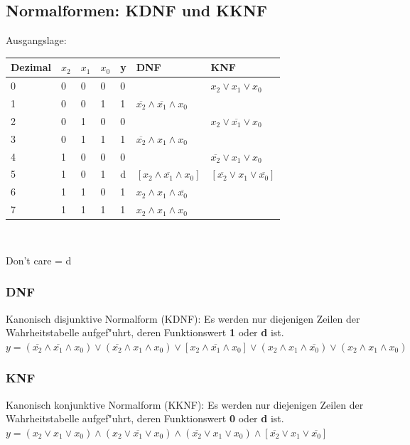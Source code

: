 \subsection{Normalformen: KDNF und KKNF}
	\begin{minipage}{10cm}
		Ausgangslage:\\
		\begin{tabular}{|l|l|l|l|l||l||l|}
			\hline	
				Dezimal & $x_2$ & $x_1$ & $x_0$ & y & DNF & KNF\\	
			\hline
			\hline
				0 & 0 & 0 & 0 & 0 & & $x_2 \vee x_1 \vee x_0$ \\
			\hline	
				1 & 0 & 0 & 1 & 1 &	$\overline{x_2} \wedge \overline{x_1} \wedge x_0$ & \\
			\hline
				2 & 0 & 1 & 0 & 0 & & $x_2 \vee \overline{x_1} \vee x_0$  \\
			\hline
				3 & 0 & 1 & 1 & 1 &	$\overline{x_2} \wedge x_1 \wedge x_0$ & \\
			\hline
				4 & 1 & 0 & 0 & 0 & & $\overline{x_2} \vee x_1 \vee x_0$ \\
			\hline
				5 & 1 & 0 & 1 & d & $[x_2 \wedge \overline{x_1} \wedge x_0]$ & $[\overline{x_2} \vee x_1 \vee \overline{x_0}]$  \\
			\hline
				6 & 1 & 1 & 0 & 1 & $x_2 \wedge x_1 \wedge \overline{x_0}$ &  \\
			\hline
				7 & 1 & 1 & 1 & 1 & $x_2 \wedge x_1 \wedge x_0$ &\\
			\hline
		\end{tabular}\\
	\newline
	
	\lbrack Don't care \rbrack = \lbrack d \rbrack
	
	\end{minipage}
\begin{minipage}{8cm}
\subsubsection{DNF} 
Kanonisch disjunktive Normalform (KDNF): Es werden nur diejenigen Zeilen der Wahrheitstabelle aufgef"uhrt, deren Funktionswert \textbf{1} oder \textbf{d} ist. \\
$y=(\overline{x_2} \wedge \overline{x_1} \wedge x_0) \vee (\overline{x_2} \wedge x_1 \wedge x_0) \vee [x_2 \wedge \overline{x_1} \wedge x_0] \vee (x_2 \wedge x_1 \wedge \overline{x_0}) \vee (x_2 \wedge x_1 \wedge x_0)$ \\

\subsubsection{KNF}
Kanonisch konjunktive Normalform (KKNF): 
Es werden nur diejenigen Zeilen der Wahrheitstabelle aufgef"uhrt, deren Funktionswert \textbf{0} oder \textbf{d} ist. \\
$y=(x_2 \vee x_1 \vee x_0) \wedge (x_2 \vee \overline{x_1} \vee x_0) \wedge (\overline{x_2} \vee x_1 \vee x_0) \wedge [\overline{x_2} \vee x_1 \vee \overline{x_0}]$ \\
\end{minipage}
